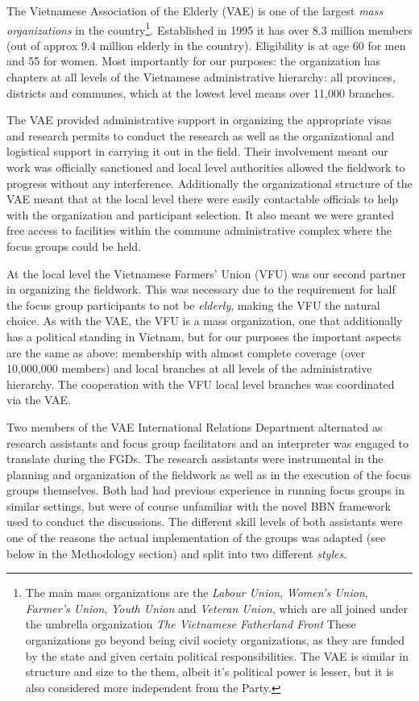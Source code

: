 \documentclass[]{article}
\let\rmarkdownfootnote\footnote%
\def\footnote{\protect\rmarkdownfootnote}
\begin{document}
The Vietnamese Association of the Elderly (VAE) is one of the largest
\emph{mass organizations} in the country\footnote{The main mass
  organizations are the \emph{Labour Union}, \emph{Women's Union},
  \emph{Farmer's Union}, \emph{Youth Union} and \emph{Veteran Union},
  which are all joined under the umbrella organization \emph{The
  Vietnamese Fatherland Front} These organizations go beyond being civil
  society organizations, as they are funded by the state and given
  certain political responsibilities. The VAE is similar in structure
  and size to the them, albeit it's political power is lesser, but it is
  also considered more independent from the Party.}. Established in 1995
it has over 8.3 million members (out of approx 9.4 million elderly in
the country). Eligibility is at age 60 for men and 55 for women. Most
importantly for our purposes: the organization has chapters at all
levels of the Vietnamese administrative hierarchy: all provinces,
districts and communes, which at the lowest level means over 11,000
branches.

The VAE provided administrative support in organizing the appropriate
visas and research permits to conduct the research as well as the
organizational and logistical support in carrying it out in the field.
Their involvement meant our work was officially sanctioned and local
level authorities allowed the fieldwork to progress without any
interference. Additionally the organizational structure of the VAE meant
that at the local level there were easily contactable officials to help
with the organization and participant selection. It also meant we were
granted free access to facilities within the commune administrative
complex where the focus groups could be held.

At the local level the Vietnamese Farmers' Union (VFU) was our second
partner in organizing the fieldwork. This was necessary due to the
requirement for half the focus group participants to not be
\emph{elderly}, making the VFU the natural choice. As with the VAE, the
VFU is a mass organization, one that additionally has a political
standing in Vietnam, but for our purposes the important aspects are the
same as above: membership with almost complete coverage (over 10,000,000
members) and local branches at all levels of the administrative
hierarchy. The cooperation with the VFU local level branches was
coordinated via the VAE.

Two members of the VAE International Relations Department alternated as
research assistants and focus group facilitators and an interpreter was
engaged to translate during the FGDs. The research assistants were
instrumental in the planning and organization of the fieldwork as well
as in the execution of the focus groups themselves. Both had had
previous experience in running focus groups in similar settings, but
were of course unfamiliar with the novel BBN framework used to conduct
the discussions. The different skill levels of both assistants were one
of the reasons the actual implementation of the groups was adapted (see
below in the Methodology section) and split into two different
\emph{styles}.
\end{document}

